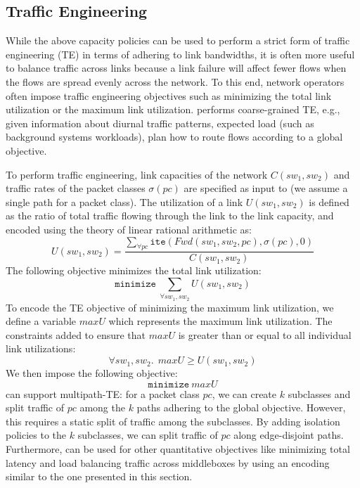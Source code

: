 \subsection{Traffic Engineering}
While the above capacity policies can be used to perform a strict form
of traffic engineering (TE) in terms of adhering to link bandwidths,
it is often more useful to balance traffic across links because a
link failure will affect fewer flows when the flows are spread evenly
across the network.  To this end, network operators often impose
traffic engineering objectives such as minimizing the total link
utilization or the maximum link utilization. 
\name performs coarse-grained TE, 
e.g., given information about diurnal traffic patterns, 
expected load (such as background systems workloads), 
plan how to route flows according to a global objective.

To perform traffic engineering, link capacities of the network $C(sw_1, sw_2)$ and traffic 
rates of the packet classes $\sigma(pc)$ are specified as input to \name (we assume a single
path for a packet class). The utilization 
of a link $U(sw_1, sw_2)$ is defined as the ratio of total traffic flowing through the link to the 
link capacity, and encoded using the theory of linear rational arithmetic as:
\begin{equation}
U(sw_1, sw_2) = \frac{\sum_{\forall pc} \texttt{ite}(Fwd(sw_1,sw_2, pc), \sigma(pc), 0)} {C(sw_1, sw_2)}
\end{equation}
The following objective minimizes the total link utilization:
\begin{equation}
	\texttt{minimize}\ \sum_{\forall sw_1, sw_2} U(sw_1, sw_2)
\end{equation}
To encode the TE objective of minimizing the maximum link utilization, we define
a variable $maxU$ which represents the maximum
link utilization. 
The constraints added to ensure that $maxU$ is greater than or equal to all 
individual link utilizations:
\begin{equation} \label{eq:maxu}
\forall sw_1, sw_2.\ \ maxU \geq U(sw_1, sw_2)
\end{equation} 
We then impose the following objective:
\begin{equation}
		\texttt{minimize}\ maxU
\end{equation}
\name can support multipath-TE: for a packet class $pc$, we can create $k$ 
subclasses and split traffic of $pc$ among the $k$ paths adhering to 
the global objective. However, this 
requires a static split of traffic among the subclasses. By adding isolation
policies to the $k$ subclasses, we can split traffic 
of $pc$ along edge-disjoint paths. Furthermore, \name can be used for other
quantitative objectives like minimizing total latency and load balancing
traffic across middleboxes by using an encoding similar 
to the one presented in this section.

